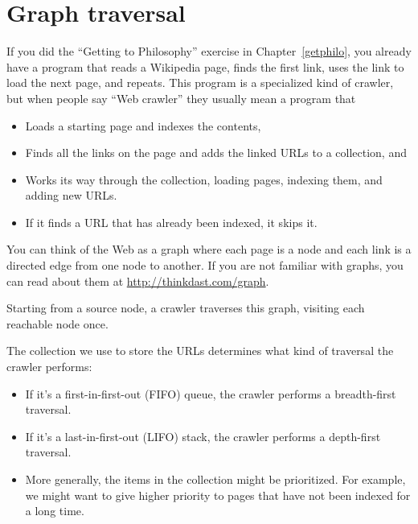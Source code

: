 \documentclass[12pt]{book}
\theoremstyle{exercise}
\begin{document}
\section{Graph traversal}
\label{graph-traversal}

If you did the ``Getting to Philosophy'' exercise in
Chapter~\ref{getphilo}, you already have a program that reads a Wikipedia
page, finds the first link, uses the link to load the next page, and
repeats. This program is a specialized kind of crawler, but when
people say ``Web crawler'' they usually mean a program that

\begin{itemize}

\item
  Loads a starting page and indexes the contents,

\item
  Finds all the links on the page and adds the linked URLs to a collection,
  and

\item
  Works its way through the collection, loading pages, indexing them, and
  adding new URLs.

\item
  If it finds a URL that has already been indexed, it skips
  it.

\end{itemize}

You can think of the Web as a graph
where each page is a node and each link is a directed edge from one node
to another. If you are not familiar with graphs, you can read about
them at \url{http://thinkdast.com/graph}.


Starting from a source node, a crawler traverses this graph,
visiting each reachable node once.


The collection we use to store the URLs determines what kind of
traversal the crawler performs:

\begin{itemize}

\item
  If it's a first-in-first-out (FIFO) queue, the crawler performs a
  breadth-first traversal.

\item
  If it's a last-in-first-out (LIFO) stack, the crawler performs a
  depth-first traversal.

\item
  More generally, the items in the collection might be prioritized. For
  example, we might want to give higher priority to pages that have not
  been indexed for a long time.

\end{itemize}
\end{document}
